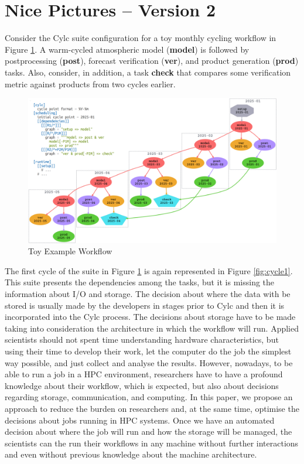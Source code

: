 \documentclass[a4paper]{article}
\begin{document}
\section{Nice Pictures -- Version 2}

Consider the Cylc suite configuration for a toy monthly cycling workflow in Figure \ref{fig:cylc}. A warm-cycled atmospheric model (\textbf{model}) is followed by postprocessing (\textbf{post}), forecast verification (\textbf{ver}), and product generation (\textbf{prod}) tasks. Also, consider, in addition, a task \textbf{check} that compares some verification metric against products from two cycles earlier.

\begin{figure}[H]
  \centering
  \includegraphics[width=0.9\columnwidth]{cylc}
  \caption{Toy Example Workflow}
  \label{fig:cylc}
\end{figure}

The first cycle of the suite in Figure \ref{fig:cylc} is again represented in Figure \ref{fig:cycle1}. This suite presents the dependencies among the tasks, but it is missing the information about I/O and storage. The decision about where the data with be stored is usually made by the developers in stages prior to Cylc and then it is incorporated into the Cylc process. The decisions about storage have to be made taking into consideration the architecture in which the workflow will run. Applied scientists should not spent time understanding hardware characteristics, but using their time to develop their work, let the computer do the job the simplest way possible, and just collect and analyse the results. However, nowadays, to be able to run a job in a HPC environment, researchers have to have a profound knowledge about their workflow, which is expected, but also about decisions regarding storage, communication, and computing. In this paper, we propose an approach to reduce the burden on researchers and, at the same time, optimise the decisions about jobs running in HPC systems. Once we have an automated decision about where the job will run and how the storage will be managed, the scientists can the run their workflows in any machine without further interactions and even without previous knowledge about the machine architecture.
\end{document}
